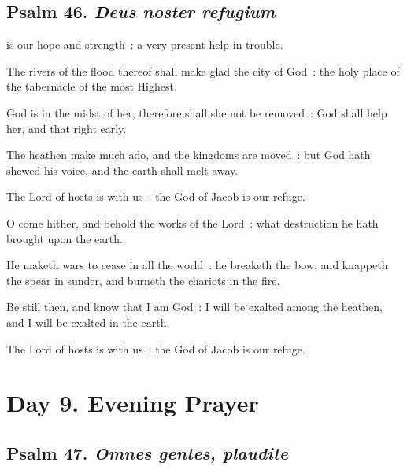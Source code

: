 \subsection{Psalm 46. \textit{Deus noster refugium}}

 is our hope and strength~: a very present help in trouble.\par
{}
The rivers of the flood thereof shall make glad the city of God~: the holy place of the tabernacle of the most Highest.\par
{}God is in the midst of her, therefore shall she not be removed~: God shall help her, and that right early.\par
{}The heathen make much ado, and the kingdoms are moved~: but God hath shewed his voice, and the earth shall melt away.\par
{}The Lord of hosts is with us~: the God of Jacob is our refuge.\par
{}O come hither, and behold the works of the Lord~: what destruction he hath brought upon the earth.\par
{}He maketh wars to cease in all the world~: he breaketh the bow, and knappeth the spear in sunder, and burneth the chariots in the fire.\par
{}Be still then, and know that I am God~: I will be exalted among the heathen, and I will be exalted in the earth.\par
{}The Lord of hosts is with us~: the God of Jacob is our refuge.\par

\section*{Day 9. Evening Prayer}

\subsection{Psalm 47. \textit{Omnes gentes, plaudite}}


